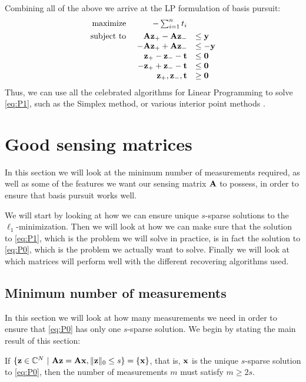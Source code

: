 Combining all of the above we arrive at the LP formulation of basis pursuit:
\begin{equation}
	\begin{array}{r r l l}
		\underset{}{\text{maximize}}~ & -\sum_{i=1}^{n} t_{i}         &          &  \\
		 \quad\text{subject to}~ & \mathbf{A}\mathbf{z}_{+} - \mathbf{A}\mathbf{z}_{-}           & \leq \mathbf{y}  &  \\
		            & -\mathbf{A}\mathbf{z}_{+} + \mathbf{A}\mathbf{z}_{-}          & \leq -\mathbf{y} &  \\
		            & \mathbf{z}_{+} - \mathbf{z}_{-} - \mathbf{t}  & \leq \mathbf{0}  &  \\
		            & -\mathbf{z}_{+} + \mathbf{z}_{-} - \mathbf{t} & \leq \mathbf{0}  &  \\
		            & \mathbf{z}_{+}, \mathbf{z}_{-}, \mathbf{t}    & \geq \mathbf{0}   &
	\end{array}
\end{equation}
Thus, we can use all the celebrated algorithms for Linear Programming to solve \eqref{eq:P1}, such as the Simplex method, or various interior point methods \cite{vanderbei14linprog}.










\section{Good sensing matrices}
\label{sec:goodmatrices}
In this section we will look at the minimum number of measurements required, as well as some of the features we want our sensing matrix $ \mathbf{A} $ to possess, in order to ensure that basis pursuit works well. 

We will start by looking at how we can ensure unique $ s $-sparse solutions to the $ \ell_{1} $-minimization. Then we will look at how we can make sure that the solution to \eqref{eq:P1}, which is the problem we will solve in practice, is in fact the solution to \eqref{eq:P0}, which is the problem we actually want to solve. Finally we will look at which matrices will perform well with the different recovering algorithms used.





\subsection{Minimum number of measurements}
\label{sec:minimum_measurements}
In this section we will look at how many measurements we need in order to ensure that \eqref{eq:P0} has only one $ s $-sparse solution. We begin by stating the main result of this section:
\begin{theorem}
	\label{thm:minimum_measurements}
	If $ \{\mathbf{z} \in \mathbb{C}^{N} ~|~ \mathbf{A}\mathbf{z} = \mathbf{A}\mathbf{x}, \lVert\mathbf{z}\rVert_{0} \leq s\}  = \{\mathbf{x}\} $, that is, $ \mathbf{x} $ is the unique $ s $-sparse solution to \eqref{eq:P0}, then the number of measurements $ m $ must satisfy $ m \geq 2s $.
\end{theorem}

